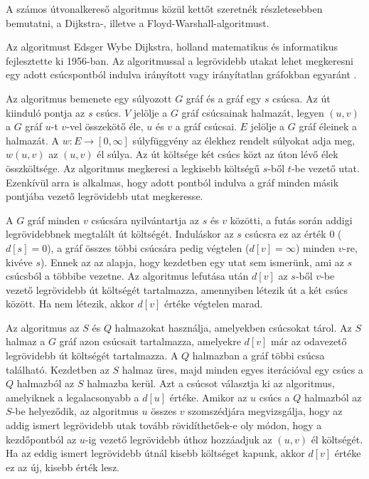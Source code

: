 
A számos útvonalkereső algoritmus közül kettőt szeretnék részletesebben bemutatni, a Dijkstra-, illetve a Floyd-Warshall-algoritmust.


Az algoritmust Edsger Wybe Dijkstra, holland matematikus és informatikus fejlesztette ki 1956-ban. Az algoritmussal a legrövidebb utakat lehet megkeresni egy adott csúcspontból indulva irányított vagy irányítatlan gráfokban egyaránt \cite{dijkstra}.

Az algoritmus bemenete egy súlyozott $G$ gráf és a gráf egy $s$ csúcsa. Az út kiinduló pontja az $s$ csúcs. $V$ jelölje a $G$ gráf csúcsainak halmazát, legyen $(u, v)$ a $G$ gráf $u$-t $v$-vel összekötő éle, $u$ és $v$ a gráf csúcsai. $E$ jelölje a $G$ gráf éleinek a halmazát. A $w: E \rightarrow [0, \infty]$ súlyfüggvény az élekhez rendelt súlyokat adja meg, $w(u, v)$ az $(u, v)$ él súlya. Az út költsége két csúcs közt az úton lévő élek összköltsége. Az algoritmus megkeresi a legkisebb költségű $s$-ből $t$-be vezető utat. Ezenkívül arra is alkalmas, hogy adott pontból indulva a gráf minden másik pontjába vezető legrövidebb utat megkeresse.

A $G$ gráf minden $v$ csúcsára nyilvántartja az $s$ és $v$ közötti, a futás során addigi legrövidebbnek megtalált út költségét. Induláskor az $s$ csúcsra ez az érték $0$ ($d[s] = 0$), a gráf összes többi csúcsára pedig végtelen ($d[v] = \infty$) minden $v$-re, kivéve $s$). Ennek az az alapja, hogy kezdetben egy utat sem ismerünk, ami az $s$ csúcsból a többibe vezetne. Az algoritmus lefutása után $d[v]$ az $s$-ből $v$-be vezető legrövidebb út költségét tartalmazza, amennyiben létezik út a két csúcs között. Ha nem létezik, akkor $d[v]$ értéke végtelen marad.

Az algoritmus az $S$ és $Q$ halmazokat használja, amelyekben csúcsokat tárol. Az $S$ halmaz a $G$ gráf azon csúcsait tartalmazza, amelyekre $d[v]$ már az odavezető legrövidebb út költségét tartalmazza. A $Q$ halmazban a gráf többi csúcsa található. Kezdetben az $S$ halmaz üres, majd minden egyes iterációval egy csúcs a $Q$ halmazból az $S$ halmazba kerül. Azt a csúcsot választja ki az algoritmus, amelyiknek a legalacsonyabb a $d[u]$ értéke. Amikor az $u$ csúcs a $Q$ halmazból az $S$-be helyeződik, az algoritmus $u$ összes $v$ szomszédjára megvizsgálja, hogy az addig ismert legrövidebb utak tovább rövidíthetőek-e oly módon, hogy a kezdőpontból az $u$-ig vezető legrövidebb úthoz hozzáadjuk az $(u, v)$ él költségét. Ha az eddig ismert legrövidebb útnál kisebb költséget kapunk, akkor $d[v]$ értéke ez az új, kisebb érték lesz.

